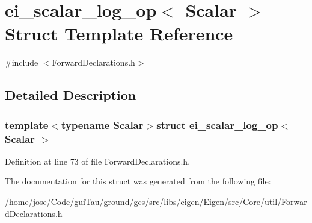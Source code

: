 \hypertarget{structei__scalar__log__op}{\section{ei\-\_\-scalar\-\_\-log\-\_\-op$<$ Scalar $>$ Struct Template Reference}
\label{structei__scalar__log__op}
}


{\ttfamily \#include $<$Forward\-Declarations.\-h$>$}



\subsection{Detailed Description}
\subsubsection*{template$<$typename Scalar$>$struct ei\-\_\-scalar\-\_\-log\-\_\-op$<$ Scalar $>$}



Definition at line 73 of file Forward\-Declarations.\-h.



The documentation for this struct was generated from the following file\-:\begin{DoxyCompactItemize}
\item 
/home/jose/\-Code/gui\-Tau/ground/gcs/src/libs/eigen/\-Eigen/src/\-Core/util/\hyperlink{_forward_declarations_8h}{Forward\-Declarations.\-h}\end{DoxyCompactItemize}
